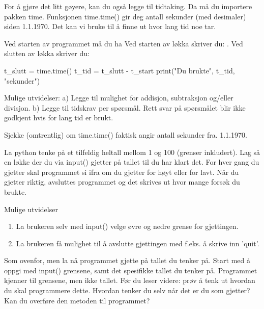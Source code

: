 {\begin{question}
For å gjøre det litt gøyere, kan du også legge til tidtaking. 
Da må du importere pakken time.
Funksjonen time.time() gir deg antall sekunder (med desimaler) siden 1.1.1970.
Det kan vi bruke til å finne ut hvor lang tid noe tar.

Ved starten av programmet må du ha  Ved starten av løkka skriver du: . Ved slutten av løkka skriver du:
\end{question}
\begin{usncodebox}
t_slutt = time.time()
t_tid = t_slutt - t_start
print("Du brukte", t_tid, "sekunder")
\end{usncodebox}

\begin{question}
Mulige utvidelser:
a) Legge til mulighet for addisjon, subtraksjon og/eller divisjon. 
b) Legge til tidskrav per spørsmål.
Rett svar på spørsmålet blir ikke godkjent hvis for lang tid er brukt. 
\end{question}

\begin{question}
Sjekke (omtrentlig) om time.time() faktisk angir antall sekunder fra. 1.1.1970. 
\end{question}

\begin{question}
La python tenke på et tilfeldig heltall mellom 1 og 100 (grenser inkludert). 
Lag så en løkke der du via input() gjetter på tallet til du har klart det. 
For hver gang du gjetter skal programmet si ifra om du gjetter for høyt eller for lavt.
Når du gjetter riktig, avsluttes programmet og det skrives ut hvor mange forsøk du brukte. 

Mulige utvidelser
\begin{enumerate}
\item La brukeren selv med input() velge øvre og nedre grense for gjettingen.
\item La brukeren få mulighet til å avslutte gjettingen med f.eks. å skrive inn 'quit'.
\end{enumerate}
\end{question}

\begin{question}
Som ovenfor, men la nå programmet gjette på tallet du tenker på.
Start med å oppgi med input() grensene, samt det spesifikke tallet du tenker på.
Programmet kjenner til grensene, men ikke tallet.
Før du leser videre: prøv å tenk ut hvordan du skal programmere dette.
Hvordan tenker du selv når det er du som gjetter?
Kan du overføre den metoden til programmet?


\end{question}}
